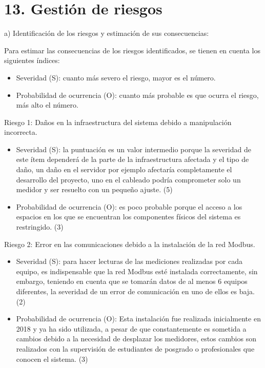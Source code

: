 \documentclass[
11pt, %
codirector, %
]{charter}
\begin{document}
\section{13. Gestión de riesgos}
\label{sec:riesgos}


a) Identificación de los riesgos y estimación de sus consecuencias:

Para estimar las consecuencias de los riesgos identificados, se tienen en cuenta los siguientes índices:

\begin{itemize}

\item Severidad (S): cuanto más severo el riesgo, mayor es el número.

\item Probabilidad de ocurrencia (O): cuanto más probable es que ocurra el riesgo, más alto el número.

\end{itemize}

Riesgo 1: Daños en la infraestructura del sistema debido a manipulación incorrecta.

\begin{itemize}
	\item Severidad (S): la puntuación es un valor intermedio porque la severidad de este ítem dependerá de la parte de la infraestructura afectada y el tipo de daño, un daño en el servidor por ejemplo afectaría completamente el desarrollo del proyecto, uno en el cableado podría comprometer solo un medidor y ser resuelto con un pequeño ajuste. (5) \\
	
	\item Probabilidad de ocurrencia (O): es poco probable porque el acceso a los espacios en los que se encuentran los componentes físicos del sistema es restringido. (3)
\end{itemize}   

Riesgo 2: Error en las comunicaciones debido a la instalación de la red Modbus.

\begin{itemize}
	\item Severidad (S): para hacer lecturas de las mediciones realizadas por cada equipo, es indispensable que la red Modbus esté instalada correctamente, sin embargo, teniendo en cuenta que se tomarán datos de al menos 6 equipos diferentes, la severidad de un error de comunicación en uno de ellos es baja. (2)  \\
	
	\item Probabilidad de ocurrencia (O): Esta instalación fue realizada inicialmente en 2018 y ya ha sido utilizada, a pesar de que constantemente es sometida a cambios debido a la necesidad de desplazar los medidores, estos cambios son realizados con la supervisión de estudiantes de posgrado o profesionales que conocen el sistema. (3)
\end{itemize}   
\end{document}
